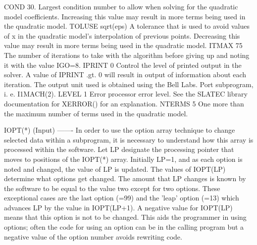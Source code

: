 \documentclass[11pt,twoside,nolof]{starlink}
\begin{document}
\begin{terminalv}
       COND       30.           Largest condition number to allow
                                when solving for the quadratic
                                model coefficients.  Increasing
                                this value may result in more
                                terms being used in the quadratic
                                model.
       TOLUSE   sqrt(eps)       A tolerance that is used to avoid
                                values of x in the quadratic
                                model's interpolation of previous
                                points.  Decreasing this value may
                                result in more terms being used in
                                the quadratic model.
        ITMAX     75            The number of iterations to take
                                with the algorithm before giving
                                up and noting it with the value
                                IGO=8.
        IPRINT     0            Control the level of printed
                                output in the solver.  A value
                                of IPRINT .gt. 0 will result in
                                output of information about each
                                iteration.  The output unit used
                                is obtained using the Bell Labs.
                                Port subprogram, i. e. I1MACH(2).
        LEVEL      1            Error processor error level.  See
                                the SLATEC library documentation
                                for XERROR() for an explanation.
        NTERMS     5            One more than the maximum number
                                of terms used in the quadratic
                                model.

  IOPT(*) (Input)
  -------
  In  order  to  use the option array technique to change selected
  data within a subprogram, it is necessary to understand how this
  array  is  processed  within the software.  Let LP designate the
  processing pointer that moves to positions of the IOPT(*) array.
  Initially  LP=1,  and  as  each option is noted and changed, the
  value  of  LP is updated.  The values of IOPT(LP) determine what
  options get changed.  The amount that LP changes is known by the
  software  to  be  equal to the value two except for two options.
  These exceptional cases are the last option (=99) and the 'leap'
  option  (=13)  which  advances LP by the value in IOPT(LP+1).  A
  negative  value for IOPT(LP) means that this option is not to be
  changed.   This aids the programmer in using options;  often the
  code  for  using  an  option can be in the calling program but a
  negative value of the option number avoids rewriting code.


\end{terminalv}
\end{document}
